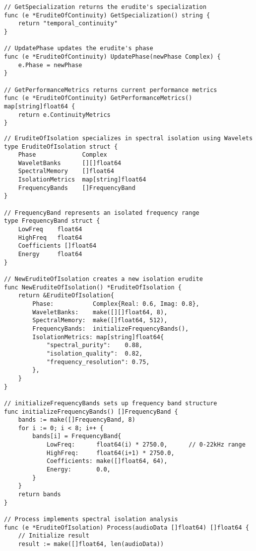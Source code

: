 \begin{tcolorbox}[colback=CodeBackground, colframe=DarkGray, title=Erudite of Continuity Implementation, fonttitle=\bfseries]
\begin{verbatim}
// GetSpecialization returns the erudite's specialization
func (e *EruditeOfContinuity) GetSpecialization() string {
    return "temporal_continuity"
}

// UpdatePhase updates the erudite's phase
func (e *EruditeOfContinuity) UpdatePhase(newPhase Complex) {
    e.Phase = newPhase
}

// GetPerformanceMetrics returns current performance metrics
func (e *EruditeOfContinuity) GetPerformanceMetrics() map[string]float64 {
    return e.ContinuityMetrics
}
\end{verbatim}
\end{tcolorbox}

\begin{tcolorbox}[colback=CodeBackground, colframe=DarkGray, title=Erudite of Isolation Implementation, fonttitle=\bfseries]
\begin{verbatim}
// EruditeOfIsolation specializes in spectral isolation using Wavelets
type EruditeOfIsolation struct {
    Phase             Complex
    WaveletBanks      [][]float64
    SpectralMemory    []float64
    IsolationMetrics  map[string]float64
    FrequencyBands    []FrequencyBand
}

// FrequencyBand represents an isolated frequency range
type FrequencyBand struct {
    LowFreq    float64
    HighFreq   float64
    Coefficients []float64
    Energy     float64
}

// NewEruditeOfIsolation creates a new isolation erudite
func NewEruditeOfIsolation() *EruditeOfIsolation {
    return &EruditeOfIsolation{
        Phase:           Complex{Real: 0.6, Imag: 0.8},
        WaveletBanks:    make([][]float64, 8),
        SpectralMemory:  make([]float64, 512),
        FrequencyBands:  initializeFrequencyBands(),
        IsolationMetrics: map[string]float64{
            "spectral_purity":    0.88,
            "isolation_quality":  0.82,
            "frequency_resolution": 0.75,
        },
    }
}

// initializeFrequencyBands sets up frequency band structure
func initializeFrequencyBands() []FrequencyBand {
    bands := make([]FrequencyBand, 8)
    for i := 0; i < 8; i++ {
        bands[i] = FrequencyBand{
            LowFreq:      float64(i) * 2750.0,      // 0-22kHz range
            HighFreq:     float64(i+1) * 2750.0,
            Coefficients: make([]float64, 64),
            Energy:       0.0,
        }
    }
    return bands
}

// Process implements spectral isolation analysis
func (e *EruditeOfIsolation) Process(audioData []float64) []float64 {
    // Initialize result
    result := make([]float64, len(audioData))
    

\end{verbatim}
\end{tcolorbox}
